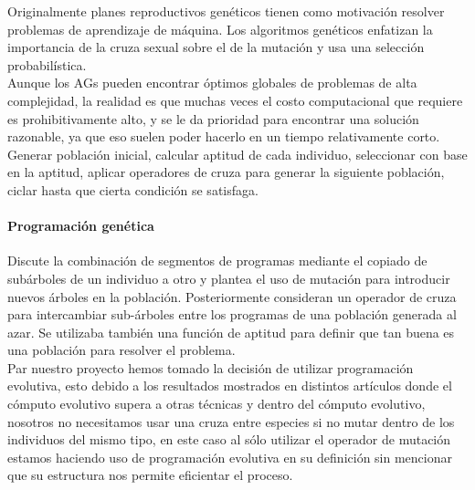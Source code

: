 			Originalmente planes reproductivos genéticos tienen como motivación resolver problemas de aprendizaje de máquina. Los algoritmos genéticos enfatizan la importancia de la cruza sexual sobre el de la mutación y usa una selección probabilística.\\
			
			Aunque los AGs pueden encontrar óptimos globales de problemas de alta complejidad, la realidad es que muchas veces el costo computacional que requiere es prohibitivamente alto, y se le da prioridad para encontrar una solución razonable, ya que eso suelen poder hacerlo en un tiempo relativamente corto.\\

			Generar población inicial, calcular aptitud de cada individuo, seleccionar con base en la aptitud, aplicar operadores de cruza para generar la siguiente población, ciclar hasta que cierta condición se satisfaga.\\

			\paragraph{Programación genética}
			Discute la combinación de segmentos de programas mediante el copiado de subárboles de un individuo a otro y plantea el uso de mutación para introducir nuevos árboles en la población. Posteriormente consideran un operador de cruza para intercambiar sub-árboles entre los programas de una población generada al azar. Se utilizaba también una función de aptitud para definir que tan buena es una población para resolver el problema.\\
			
		Par nuestro proyecto hemos tomado la decisión de utilizar programación evolutiva, esto debido a los resultados mostrados en distintos artículos donde el cómputo evolutivo supera a otras técnicas y dentro del cómputo evolutivo, nosotros no necesitamos usar una cruza entre especies si no mutar dentro de los individuos del mismo tipo, en este caso al sólo utilizar el operador de mutación estamos haciendo uso de programación evolutiva en su definición sin mencionar que su estructura nos permite eficientar el proceso.	
